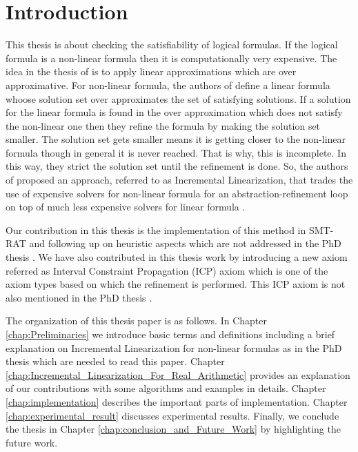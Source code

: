 \chapter{Introduction}
\label{chap:Introduction}
This thesis is about checking the satisfiability of logical formulas.
If the logical formula is a non-linear formula then it is computationally very expensive.
The idea in the thesis of \cite{Cimatti:2018:ILS:3274693.3230639} is to apply linear approximations which are over approximative.
For non-linear formula, the authors of \cite{Cimatti:2018:ILS:3274693.3230639} define a linear formula whoose solution set over approximates the set of satisfying solutions.
If a solution for the linear formula is found in the over approximation which does not satisfy the non-linear one then they refine the formula by making the solution set smaller.
The solution set gets smaller means it is getting closer to the non-linear formula though in general it is never reached.
That is why, this is incomplete.
In this way, they strict the solution set until the refinement is done.
So, the authors of \cite{Cimatti:2018:ILS:3274693.3230639} proposed an approach, referred to as Incremental Linearization, that trades the use of expensive solvers for non-linear
formula for an abstraction-refinement loop on top of much less expensive solvers for linear formula \cite{Cimatti:2018:ILS:3274693.3230639}.\newline

\noindent Our contribution in this thesis is the implementation of this method in SMT-RAT and following up on heuristic aspects which are not addressed in the PhD thesis \cite{Cimatti:2018:ILS:3274693.3230639}.
We have also contributed in this thesis work by introducing a new axiom referred as Interval Constraint Propagation (ICP) axiom which is one of the axiom types based on which the refinement is performed.
This ICP axiom is not also mentioned in the PhD thesis \cite{Cimatti:2018:ILS:3274693.3230639}.\newline

\noindent The organization of this thesis paper is as follows.
In Chapter \ref{chap:Preliminaries} we introduce basic terms and definitions including a brief explanation on Incremental Linearization for non-linear formulas as in the PhD thesis \cite{Cimatti:2018:ILS:3274693.3230639} which are needed to read this paper.
Chapter \ref{chap:Incremental_Linearization_For_Real_Arithmetic} provides an explanation of our contributions with some algorithms and examples in details.
Chapter \ref{chap:implementation} describes the important parts of implementation.
Chapter \ref{chap:experimental_result} discusses experimental results.
Finally, we conclude the thesis in Chapter \ref{chap:conclusion_and_Future_Work} by highlighting the future work.

